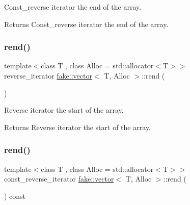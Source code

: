 Const\+\_\+reverse iterator the end of the array. 

\begin{DoxyReturn}{Returns}
Const\+\_\+reverse iterator the end of the array. 
\end{DoxyReturn}
\mbox{\label{classfake_1_1vector_ad3653b40c34a276138f7e09f8db45ead}} 
\subsubsection{\texorpdfstring{rend()}{rend()}\hspace{0.1cm}{\footnotesize\ttfamily [1/2]}}
{\footnotesize\ttfamily template$<$class T , class Alloc  = std\+::allocator$<$\+T$>$$>$ \\
reverse\+\_\+iterator \mbox{\hyperlink{classfake_1_1vector}{fake\+::vector}}$<$ T, Alloc $>$\+::rend (\begin{DoxyParamCaption}{ }\end{DoxyParamCaption})\hspace{0.3cm}{\ttfamily [inline]}}



Reverse iterator the start of the array. 

\begin{DoxyReturn}{Returns}
Reverse iterator the start of the array. 
\end{DoxyReturn}
\mbox{\label{classfake_1_1vector_aa964e3b45beb15c3883d544e4f27a605}} 
\subsubsection{\texorpdfstring{rend()}{rend()}\hspace{0.1cm}{\footnotesize\ttfamily [2/2]}}
{\footnotesize\ttfamily template$<$class T , class Alloc  = std\+::allocator$<$\+T$>$$>$ \\
const\+\_\+reverse\+\_\+iterator \mbox{\hyperlink{classfake_1_1vector}{fake\+::vector}}$<$ T, Alloc $>$\+::rend (\begin{DoxyParamCaption}{ }\end{DoxyParamCaption}) const\hspace{0.3cm}{\ttfamily [inline]}}



